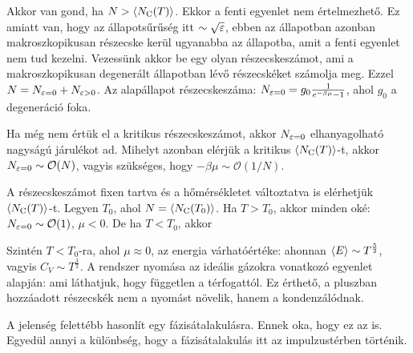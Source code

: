    Akkor van gond, ha $N>\left\langle N_\text{C}(T)\right\rangle$. Ekkor a fenti egyenlet nem értelmezhető. Ez amiatt van, hogy az állapotsűrűség itt $\sim\sqrt{\varepsilon}$, ebben az állapotban azonban makroszkopikusan részecske kerül ugyanabba az állapotba, amit a fenti egyenlet nem tud kezelni. Vezessünk akkor be egy olyan részecskeszámot, ami a makroszkopikusan degenerált állapotban lévő részecskéket számolja meg. Ezzel $N=N_{\varepsilon=0}+N_{\varepsilon>0}$. Az alapállapot részecskeszáma: $N_{\varepsilon=0}=g_0\frac{1}{e^{-\beta\mu}-1}$, ahol $g_0$ a degeneráció foka. 
   
   Ha még nem értük el a kritikus részecskeszámot, akkor $N_{\varepsilon=0}$ elhanyagolható nagyságú járulékot ad. Mihelyt azonban elérjük a kritikus $\left\langle N_\text{C}(T)\right\rangle$-t, akkor $N_{\varepsilon=0}\sim\mathcal{O}(N)$, vagyis szükséges, hogy $-\beta\mu\sim\mathcal{O}(1/N)$. 
   
   A részecskeszámot fixen tartva és a hőmérsékletet változtatva is elérhetjük $\left\langle N_\text{C}(T)\right\rangle$-t. Legyen $T_0$, ahol $N=\left\langle N_\text{C}(T_0)\right\rangle$. Ha $T>T_0$, akkor minden oké: $N_{\varepsilon=0}\sim\mathcal{O}(1)$, $\mu<0$. De ha $T<T_0$, akkor 
   
   Szintén $T<T_0$-ra, ahol $\mu\approx 0$, az energia várhatóértéke:
   ahonnan $\left\langle E\right\rangle\sim T^{\frac{5}{2}}$, vagyis $C_V\sim T^{\frac{3}{2}}$. A rendszer nyomása az ideális gázokra vonatkozó  egyenlet alapján:
   ami láthatjuk, hogy független a térfogattól. Ez érthető, a pluszban hozzáadott részecskék nem a nyomást növelik, hanem a kondenzálódnak. 
   
   A jelenség felettébb hasonlít egy fázisátalakulásra. Ennek oka, hogy ez az is. Egyedül annyi a különbség, hogy a fázisátalakulás itt az impulzustérben történik.
   
   
   
   
   
   
   
   
   
   
   
